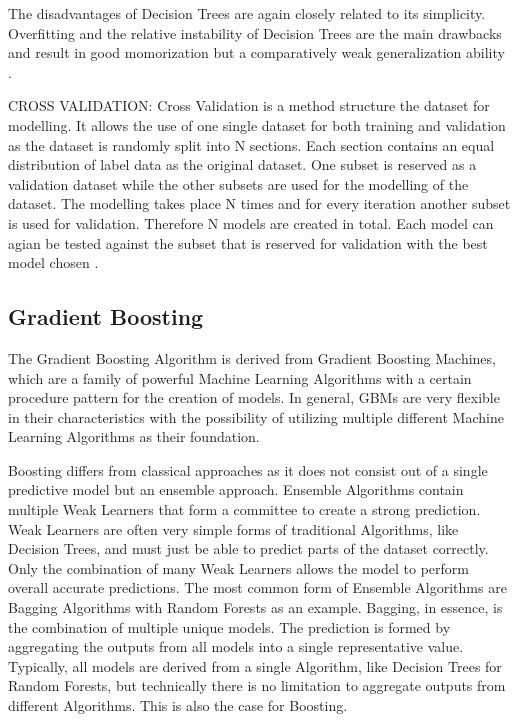 The disadvantages of Decision Trees are again closely related to its simplicity. Overfitting and 
the relative instability of Decision Trees are the main drawbacks and result in good momorization 
but a comparatively weak generalization ability \cite[p.339]{James2021} \cite[10.10.]{sklearn Decision Trees}.

CROSS VALIDATION: Cross Validation is a method structure the dataset for modelling. It allows the use of 
one single dataset for both training and validation as the dataset is randomly split into N sections. Each 
section contains an equal distribution of label data as the original dataset. One subset is reserved as a 
validation dataset while the other subsets are used for the modelling of the dataset. The modelling takes place 
N times and for every iteration another subset is used for validation. Therefore N models are created in total. 
Each model can agian be tested against the subset that is reserved for validation with the best model chosen \cite[p.8f]{lewis2000introduction}. 

\subsection{Gradient Boosting}

The Gradient Boosting Algorithm is derived from Gradient Boosting Machines, which are a family of 
powerful Machine Learning Algorithms with a certain procedure pattern for the creation of models. 
In general, GBMs are very flexible in their characteristics with the possibility of utilizing 
multiple different Machine Learning Algorithms as their foundation.

Boosting differs from classical approaches as it does not consist out of a single predictive 
model but an ensemble approach. Ensemble Algorithms contain multiple Weak Learners that form a 
committee to create a strong prediction. Weak Learners are often very simple forms of traditional 
Algorithms, like Decision Trees, and must just be able to predict parts of the dataset correctly. 
Only the combination of many Weak Learners allows the model to perform overall accurate 
predictions. The most common form of Ensemble Algorithms are Bagging Algorithms with Random 
Forests as an example. Bagging, in essence, is the combination of multiple unique models. The 
prediction is formed by aggregating the outputs from all models into a single representative 
value. Typically, all models are derived from a single Algorithm, like Decision Trees for Random 
Forests, but technically there is no limitation to aggregate outputs from different Algorithms. 
This is also the case for Boosting. 

